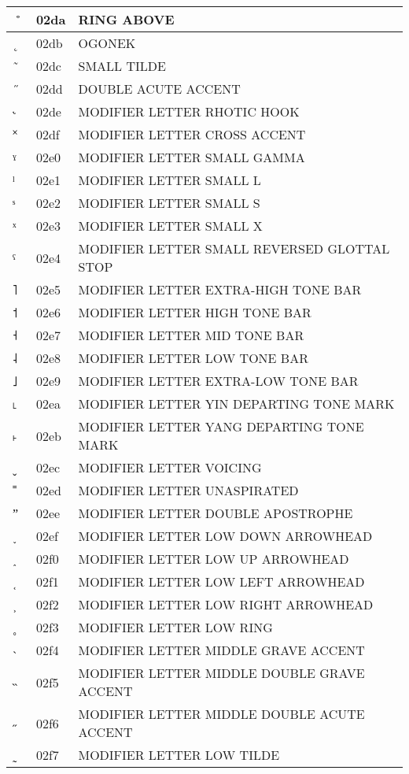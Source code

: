 \documentclass[12pt,letterpaper,openany]{book}
\begin{document}
\begin{center}
\begin{supertabular}{|m{0.25in}|m{0.5in}|m{4in}|}
˚ & 02da & RING ABOVE\\\hline
˛ & 02db & OGONEK\\\hline
˜ & 02dc & SMALL TILDE\\\hline
˝ & 02dd & DOUBLE ACUTE ACCENT\\\hline
˞ & 02de & MODIFIER LETTER RHOTIC HOOK\\\hline
˟ & 02df & MODIFIER LETTER CROSS ACCENT\\\hline
ˠ & 02e0 & MODIFIER LETTER SMALL GAMMA\\\hline
ˡ & 02e1 & MODIFIER LETTER SMALL L\\\hline
ˢ & 02e2 & MODIFIER LETTER SMALL S\\\hline
ˣ & 02e3 & MODIFIER LETTER SMALL X\\\hline
ˤ & 02e4 & MODIFIER LETTER SMALL REVERSED GLOTTAL STOP\\\hline
˥ & 02e5 & MODIFIER LETTER EXTRA-HIGH TONE BAR\\\hline
˦ & 02e6 & MODIFIER LETTER HIGH TONE BAR\\\hline
˧ & 02e7 & MODIFIER LETTER MID TONE BAR\\\hline
˨ & 02e8 & MODIFIER LETTER LOW TONE BAR\\\hline
˩ & 02e9 & MODIFIER LETTER EXTRA-LOW TONE BAR\\\hline
˪ & 02ea & MODIFIER LETTER YIN DEPARTING TONE MARK\\\hline
˫ & 02eb & MODIFIER LETTER YANG DEPARTING TONE MARK\\\hline
ˬ & 02ec & MODIFIER LETTER VOICING\\\hline
˭ & 02ed & MODIFIER LETTER UNASPIRATED\\\hline
ˮ & 02ee & MODIFIER LETTER DOUBLE APOSTROPHE\\\hline
˯ & 02ef & MODIFIER LETTER LOW DOWN ARROWHEAD\\\hline
˰ & 02f0 & MODIFIER LETTER LOW UP ARROWHEAD\\\hline
˱ & 02f1 & MODIFIER LETTER LOW LEFT ARROWHEAD\\\hline
˲ & 02f2 & MODIFIER LETTER LOW RIGHT ARROWHEAD\\\hline
˳ & 02f3 & MODIFIER LETTER LOW RING\\\hline
˴ & 02f4 & MODIFIER LETTER MIDDLE GRAVE ACCENT\\\hline
˵ & 02f5 & MODIFIER LETTER MIDDLE DOUBLE GRAVE ACCENT\\\hline
˶ & 02f6 & MODIFIER LETTER MIDDLE DOUBLE ACUTE ACCENT\\\hline
˷ & 02f7 & MODIFIER LETTER LOW TILDE\\\hline

\end{supertabular}
\end{center}
\end{document}
